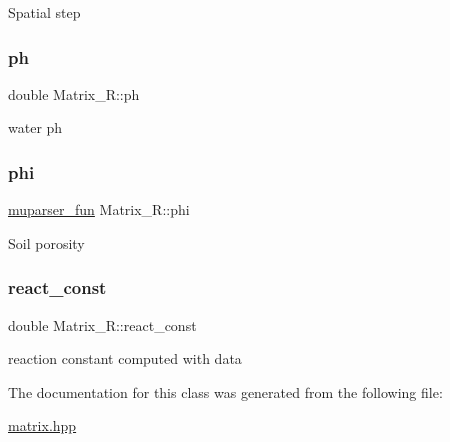 Spatial step \mbox{\label{classMatrix__R_ae8345433c06d0d0249c09783c4ff80bc}} 
\subsubsection{\texorpdfstring{ph}{ph}}
{\footnotesize\ttfamily double Matrix\+\_\+\+R\+::ph\hspace{0.3cm}{\ttfamily [private]}}

water ph \mbox{\label{classMatrix__R_a8527ebc8844931d65e65c168956398ff}} 
\subsubsection{\texorpdfstring{phi}{phi}}
{\footnotesize\ttfamily \hyperlink{classmuparser__fun}{muparser\+\_\+fun} Matrix\+\_\+\+R\+::phi\hspace{0.3cm}{\ttfamily [private]}}

Soil porosity \mbox{\label{classMatrix__R_af2872298a4ebd9ac7493a1f55e3fa586}} 
\subsubsection{\texorpdfstring{react\+\_\+const}{react\_const}}
{\footnotesize\ttfamily double Matrix\+\_\+\+R\+::react\+\_\+const\hspace{0.3cm}{\ttfamily [private]}}

reaction constant computed with data 

The documentation for this class was generated from the following file\+:\begin{DoxyCompactItemize}
\item 
\hyperlink{matrix_8hpp}{matrix.\+hpp}\end{DoxyCompactItemize}
